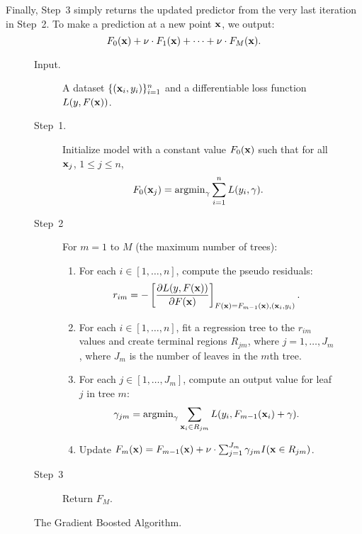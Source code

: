 Finally, Step~3 simply returns the updated predictor from the very last iteration
in Step~2. To make a prediction at a new point $\mathbf{x}$, we output:
\[
    F_0(\mathbf{x}) + \nu \cdot F_1(\mathbf{x}) + \cdots + \nu \cdot F_M(\mathbf{x}).
\]

\begin{figure}[th!]
{\small
\begin{description}
    \item[Input.] A dataset $\{(\mathbf{x}_i, y_i)\}_{i = 1}^{n}$ and a 
        differentiable loss function $L(y, F(\mathbf{x}))$.
    
    \item[Step~1.] Initialize model with a constant value $F_0(\mathbf{x})$ such
        that for all $\mathbf{x}_j$, $1 \leq j \leq n$,
        \begin{equation}
            F_0(\mathbf{x}_j) = \operatorname{argmin}_{\gamma} \sum_{i = 1}^{n} L(y_i, \gamma).
        \end{equation}   
    \item[Step~2] For $m = 1$ to $M$ (the maximum number of trees):
        \begin{enumerate}
            \item For each $i \in [1, \ldots, n]$, compute the pseudo residuals:
                \begin{equation} \label{eqn:pseudo_residuals}
                    r_{i m} = 
                            - \left [ 
                                \frac{\partial L(y, F(\mathbf{x}))}{\partial F(\mathbf{x})} 
                              \right ]_{F(\mathbf{x}) = F_{m - 1}(\mathbf{x}), (\mathbf{x}_i, y_i)}.
                \end{equation}
            \item For each $i \in [1, \ldots, n]$, fit a regression tree to the 
                $r_{i m}$ values and create terminal regions $R_{j m}$, where 
                $j = 1, \ldots, J_m$, where $J_m$ is the number of leaves in the 
                $m$th tree.
            \item For each $j \in [1, \ldots, J_m]$, compute an output value for 
                leaf $j$ in tree $m$:
                \begin{equation}
                    \label{eqn:leaf_values}
                    \gamma_{j m} = \operatorname{argmin}_{\gamma} 
                            \sum_{\mathbf{x}_i \in R_{j m}} L(y_i, F_{m - 1}(\mathbf{x}_i) + \gamma).
                \end{equation}
            \item Update $F_m(\mathbf{x}) = F_{m - 1}(\mathbf{x}) + 
                \nu \cdot \sum_{j = 1}^{J_m} \gamma_{j m} I(\mathbf{x} \in R_{j m})$.
        \end{enumerate}
    \item[Step~3] Return $F_M$.
\end{description}
}
 \caption{The Gradient Boosted Algorithm.}
\label{fig:gbm_algo}
\end{figure}


